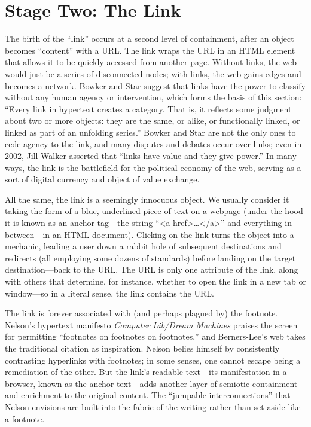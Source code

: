 \section{Stage Two: The Link}

The birth of the ``link'' occurs at a second level of containment, after an object becomes ``content'' with a URL. The link wraps the URL in an HTML element that allows it to be quickly accessed from another page. Without links, the web would just be a series of disconnected nodes; with links, the web gains edges and becomes a network. Bowker and Star suggest that links have the power to classify without any human agency or intervention, which forms the basis of this section: ``Every link in hypertext creates a category. That is, it reflects some judgment about two or more objects: they are the same, or alike, or functionally linked, or linked as part of an unfolding series.''\autocite{bowker_star} Bowker and Star are not the only ones to cede agency to the link, and many disputes and debates occur over links; even in 2002, Jill Walker asserted that ``links have value and they give power.''\autocite{walker} In many ways, the link is the battlefield for the political economy of the web, serving as a sort of digital currency and object of value exchange.

All the same, the link is a seemingly innocuous object. We usually consider it taking the form of a blue, underlined piece of text on a webpage (under the hood it is known as an anchor tag---the string ``<a href>\ldots</a>'' and everything in between—in an HTML document). Clicking on the link turns the object into a mechanic, leading a user down a rabbit hole of subsequent destinations and redirects (all employing some dozens of standards) before landing on the target destination---back to the URL. The URL is only one attribute of the link, along with others that determine, for instance, whether to open the link in a new tab or window---so in a literal sense, the link contains the URL.

The link is forever associated with (and perhaps plagued by) the footnote. Nelson's hypertext manifesto \emph{Computer Lib/Dream Machines} praises the screen for permitting ``footnotes on footnotes on footnotes,''\autocite{nelson} and Berners-Lee's web takes the traditional citation as inspiration. Nelson belies himself by consistently contrasting hyperlinks with footnotes; in some senses, one cannot escape being a remediation of the other. But the link's readable text---its manifestation in a browser, known as the anchor text---adds another layer of semiotic containment and enrichment to the original content. The ``jumpable interconnections'' that Nelson envisions are built into the fabric of the writing rather than set aside like a footnote.

